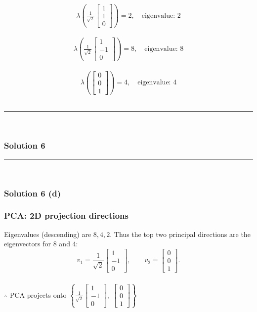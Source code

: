 \documentclass{article}
\begin{document}
{$$\lambda\!\left(\tfrac{1}{\sqrt{2}}\begin{bmatrix}1 \\ 1 \\ 0\end{bmatrix}\right)=2,\quad \text{eigenvalue: } 2$$\\
$$\lambda\!\left(\tfrac{1}{\sqrt{2}}\begin{bmatrix}1 \\ -1 \\ 0\end{bmatrix}\right)=8,\quad \text{eigenvalue: } 8$$ \\
$$\lambda\!\left(\begin{bmatrix}0 \\ 0 \\ 1\end{bmatrix}\right)=4, \quad \text{eigenvalue: } 4$$ \\

\noindent\rule{\textwidth}{0.4pt}\\

\newpage

\subsubsection*{Solution 6}
\noindent\rule{\textwidth}{0.4pt}\\
\subsubsection*{Solution 6 (d)}
\subsubsection*{PCA: 2D projection directions}
Eigenvalues (descending) are $8,4,2$. Thus the top two principal directions are the eigenvectors for $8$ and $4$:
\[
v_1=\frac{1}{\sqrt{2}}\begin{bmatrix}1 \\ -1 \\ 0\end{bmatrix},\qquad
v_2=\begin{bmatrix}0 \\ 0 \\ 1\end{bmatrix}.
\]
\subsubsection*{\normalfont}{$\therefore$ PCA projects onto $\left\{\tfrac{1}{\sqrt{2}}\begin{bmatrix}1 \\ -1 \\ 0\end{bmatrix},\;\begin{bmatrix}0 \\ 0 \\ 1\end{bmatrix}\right\}$}\\

}
\end{document}
